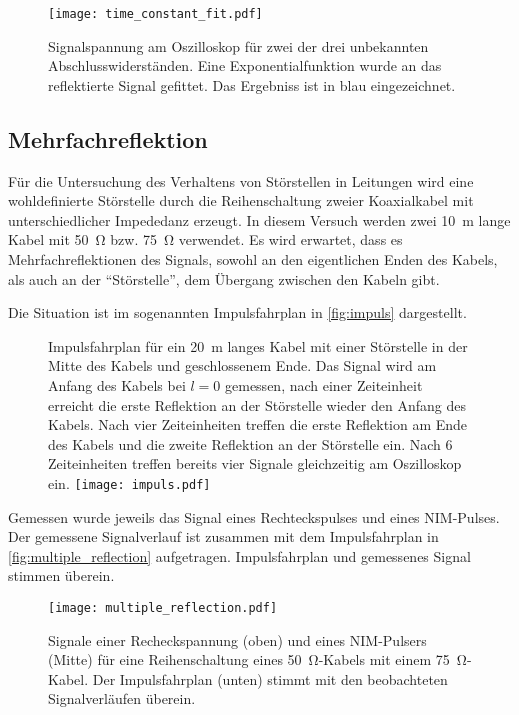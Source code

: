 \begin{figure}
  \centering
  \texttt{[image: time\_constant\_fit.pdf]}
  \caption{%
    Signalspannung am Oszilloskop für zwei der drei unbekannten Abschlusswiderständen. Eine Exponentialfunktion wurde an das reflektierte Signal
    gefittet. Das Ergebniss ist in blau eingezeichnet. 
  }\label{fig:fit}
\end{figure}
\subsection{Mehrfachreflektion}

Für die Untersuchung des Verhaltens von Störstellen in Leitungen wird eine wohldefinierte
Störstelle durch die Reihenschaltung zweier Koaxialkabel mit unterschiedlicher Impededanz
erzeugt.
In diesem Versuch werden zwei \SI{10}{\meter} lange Kabel mit \SI{50}{\ohm} bzw. \SI{75}{\ohm} verwendet.
Es wird erwartet, dass es Mehrfachreflektionen des Signals, sowohl an den eigentlichen Enden
des Kabels, als auch an der \enquote{Störstelle}, dem Übergang zwischen den Kabeln gibt.

Die Situation ist im sogenannten Impulsfahrplan in \autoref{fig:impuls} dargestellt.

\begin{figure}
  \captionsetup{format=plain}
  \begin{captionbeside}{%
      Impulsfahrplan für ein \SI{20}{\meter} langes Kabel mit einer Störstelle in 
      der Mitte des Kabels und geschlossenem Ende.
      Das Signal wird am  Anfang des Kabels bei $l = 0$ gemessen, nach einer Zeiteinheit
      erreicht die erste Reflektion an der Störstelle wieder den Anfang des Kabels.
      Nach vier Zeiteinheiten treffen die erste Reflektion am Ende des Kabels und die
      zweite Reflektion an der Störstelle ein. Nach 6 Zeiteinheiten treffen bereits vier
      Signale gleichzeitig am Oszilloskop ein.
    }%
    \texttt{[image: impuls.pdf]}
  \end{captionbeside}\label{fig:impuls}
\end{figure}

Gemessen wurde jeweils das Signal eines Rechteckspulses und eines NIM-Pulses. 
Der gemessene Signalverlauf ist zusammen mit dem Impulsfahrplan in \autoref{fig:multiple_reflection} aufgetragen.
Impulsfahrplan und gemessenes Signal stimmen überein.

\begin{figure}
  \centering
  \texttt{[image: multiple\_reflection.pdf]}
  \caption{%
    Signale einer Recheckspannung (oben) und eines NIM-Pulsers (Mitte) für eine Reihenschaltung eines \SI{50}{\ohm}-Kabels mit einem \SI{75}{\ohm}-Kabel. 
    Der Impulsfahrplan (unten) stimmt mit den beobachteten Signalverläufen überein.
  }\label{fig:multiple_reflection}
\end{figure}

